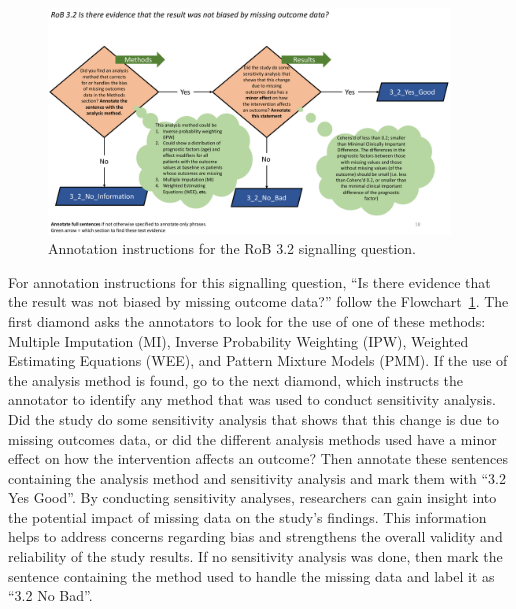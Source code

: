 \documentclass[sn-mathphys,Numbered]{sn-jnl}%
\begin{document}
%
%
%
\begin{figure}[hbt]
    \centering
    \includegraphics[width=0.95\textwidth]{figures/3_2.pdf}
    \caption{Annotation instructions for the RoB 3.2 signalling question.}
    \label{fig:3_2}
\end{figure}
%
%
%


For annotation instructions for this signalling question, ``Is there evidence that the result was not biased by missing outcome data?'' follow the Flowchart~\ref{fig:3_2}.
The first diamond asks the annotators to look for the use of one of these methods: Multiple Imputation (MI), Inverse Probability Weighting (IPW), Weighted Estimating Equations (WEE), and Pattern Mixture Models (PMM).
If the use of the analysis method is found, go to the next diamond, which instructs the annotator to identify any method that was used to conduct sensitivity analysis.
Did the study do some sensitivity analysis that shows that this change is due to missing outcomes data, or did the different analysis methods used have a minor effect on how the intervention affects an outcome?
Then annotate these sentences containing the analysis method and sensitivity analysis and mark them with ``3.2 Yes Good''.
By conducting sensitivity analyses, researchers can gain insight into the potential impact of missing data on the study's findings. This information helps to address concerns regarding bias and strengthens the overall validity and reliability of the study results.
If no sensitivity analysis was done, then mark the sentence containing the method used to handle the missing data and label it as ``3.2 No Bad''.
%
%
%
\end{document}
